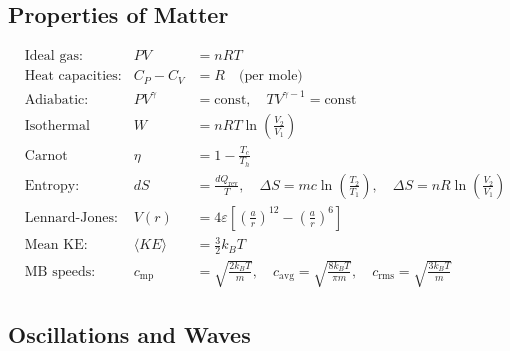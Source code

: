 \subsection*{Properties of Matter}

\begin{align*}
&\text{Ideal gas:} & PV &= nRT \\[4pt]
&\text{Heat capacities:} & C_P - C_V &= R \quad\text{(per mole)} \\[4pt]
&\text{Adiabatic:} & PV^\gamma &= \text{const}, \quad TV^{\gamma-1} = \text{const} \\[4pt]
&\text{Isothermal work:} & W &= nRT\ln\!\left(\frac{V_2}{V_1}\right) \\[4pt]
&\text{Carnot efficiency:} & \eta &= 1 - \frac{T_c}{T_h} \\[4pt]
&\text{Entropy:} & dS &= \frac{dQ_\text{rev}}{T}, \quad \Delta S = mc\ln\!\left(\frac{T_2}{T_1}\right), \quad \Delta S = nR\ln\!\left(\frac{V_2}{V_1}\right) \\[4pt]
&\text{Lennard-Jones:} & V(r) &= 4\varepsilon\left[\left(\frac{a}{r}\right)^{12} - \left(\frac{a}{r}\right)^{6}\right] \\[4pt]
&\text{Mean KE:} & \langle KE \rangle &= \tfrac{3}{2}k_B T \\[4pt]
&\text{MB speeds:} & c_\text{mp} &= \sqrt{\frac{2k_BT}{m}}, \quad c_\text{avg} = \sqrt{\frac{8k_BT}{\pi m}}, \quad c_\text{rms} = \sqrt{\frac{3k_BT}{m}}
\end{align*}

\subsection*{Oscillations and Waves}

